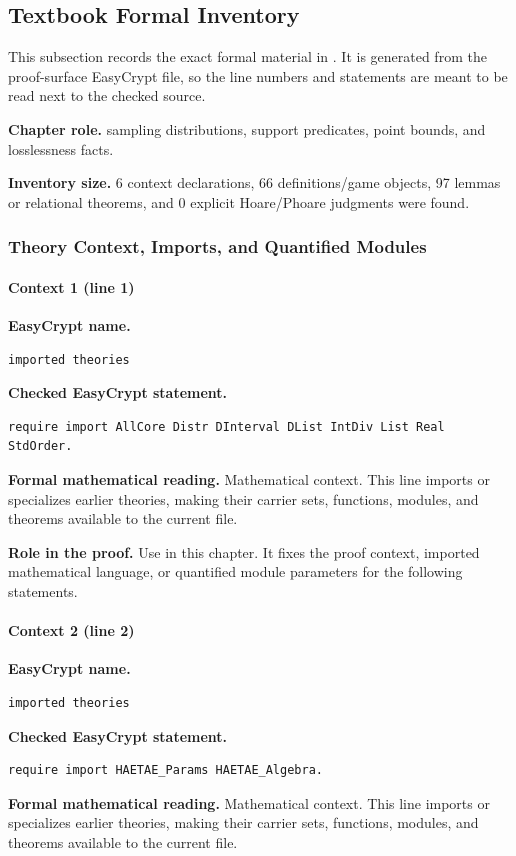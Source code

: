 \subsection*{Textbook Formal Inventory}
This subsection records the exact formal material in .  It is generated from the proof-surface EasyCrypt file, so the line numbers and statements are meant to be read next to the checked source.

\noindent\textbf{Chapter role.} sampling distributions, support predicates, point bounds, and losslessness facts.

\noindent\textbf{Inventory size.} 6 context declarations, 66 definitions/game objects, 97 lemmas or relational theorems, and 0 explicit Hoare/Phoare judgments were found.

\subsubsection*{Theory Context, Imports, and Quantified Modules}
\paragraph{Context 1 (line 1)}
\noindent\textbf{EasyCrypt name.}
\begin{lstlisting}[language=EasyCrypt,basicstyle=\ttfamily\scriptsize]
imported theories
\end{lstlisting}
\noindent\textbf{Checked EasyCrypt statement.}
\begin{lstlisting}[language=EasyCrypt,basicstyle=\ttfamily\scriptsize]
require import AllCore Distr DInterval DList IntDiv List Real StdOrder.
\end{lstlisting}
\noindent\textbf{Formal mathematical reading.}
Mathematical context. This line imports or specializes earlier theories, making their carrier sets, functions, modules, and theorems available to the current file.

\noindent\textbf{Role in the proof.}
Use in this chapter. It fixes the proof context, imported mathematical language, or quantified module parameters for the following statements.

\paragraph{Context 2 (line 2)}
\noindent\textbf{EasyCrypt name.}
\begin{lstlisting}[language=EasyCrypt,basicstyle=\ttfamily\scriptsize]
imported theories
\end{lstlisting}
\noindent\textbf{Checked EasyCrypt statement.}
\begin{lstlisting}[language=EasyCrypt,basicstyle=\ttfamily\scriptsize]
require import HAETAE_Params HAETAE_Algebra.
\end{lstlisting}
\noindent\textbf{Formal mathematical reading.}
Mathematical context. This line imports or specializes earlier theories, making their carrier sets, functions, modules, and theorems available to the current file.


